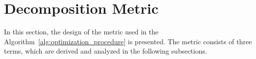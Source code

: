 \documentclass[../main.tex]{subfiles}
\begin{document}


\section{Decomposition Metric}
\label{section:multi_decomposition_metric}

In this section, the design of  the metric used in the Algorithm~\ref{alg:optimization_procedure} is presented. The metric consists of three terms, which are derived and analyzed in the following subsections.
\end{document}
